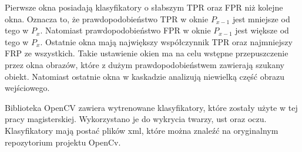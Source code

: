 \documentclass[a4paper,twoside,12pt]{book}
\begin{document}
    Pierwsze okna posiadają klasyfikatory o słabszym TPR oraz FPR niż kolejne okna.
    Oznacza to, że prawdopodobieństwo TPR w oknie $P_{x-1}$ jest mniejsze od tego w $P_{x}$.
    Natomiast prawdopodobieństwo FPR w oknie $P_{x-1}$ jest większe od tego w $P_{x}$.
    Ostatnie okna mają największy współczynnik TPR oraz najmniejszy FRP ze wszystkich.
    Takie ustawienie okien ma na celu wstępne przepuszczenie przez okna obrazów,
    które z dużym prawdopodobieństwem zawierają szukany obiekt.
    Natomiast ostatnie okna w kaskadzie analizują niewielką część obrazu wejściowego.

    Biblioteka OpenCV zawiera wytrenowane klasyfikatory, które zostały użyte w tej pracy magisterskiej.
    Wykorzystano
    je do wykrycia twarzy, ust oraz oczu.
    Klasyfikatory mają postać plików xml, które można znaleźć na oryginalnym
    repozytorium projektu OpenCv.

\end{document}
